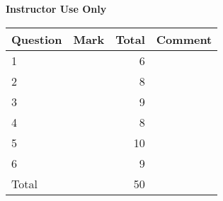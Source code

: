 \documentclass[12pt,legalpaper]{exam}
\begin{document}
\begin{center}
    {\bf Instructor Use Only}\\
    \vspace{.5cm}
    \begin{tabular}{|l|l|r|l|}
        \hline
        Question & Mark & Total & Comment\\
        \hline
        1 & & 6  & \\ \hline
        2 & & 8  & \\ \hline
        3 & & 9  & \\ \hline
        4 & & 8  & \\ \hline
        5 & & 10 & \\ \hline
        6 & & 9  & \\ \hline
        \hline
        Total & & 50 &\\
        \hline
    \end{tabular}
\end{center}

\begin{questions}
\end{questions}
\end{document}
